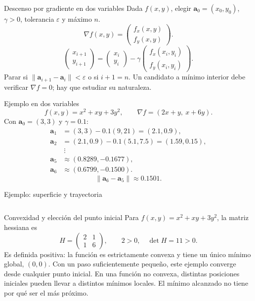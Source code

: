 \documentclass[original_version/main.tex]{subfiles}
\begin{document}
\begin{frame}[t]{Descenso por gradiente en dos variables}
\small Dada $f(x,y)$, elegir $\boldsymbol{a}_0=(x_0,y_0)$, $\gamma>0$, tolerancia $\varepsilon$ y máximo $n$.
\[\nabla f(x,y)=\begin{pmatrix}f_x(x,y)\\f_y(x,y)\end{pmatrix}.\]
\[\begin{pmatrix}x_{i+1}\\y_{i+1}\end{pmatrix}
=\begin{pmatrix}x_i\\y_i\end{pmatrix}
-\gamma\begin{pmatrix}f_x(x_i,y_i)\\f_y(x_i,y_i)\end{pmatrix}.\]
Parar si $\|\boldsymbol{a}_{i+1}-\boldsymbol{a}_i\|<\varepsilon$ o si $i+1=n$.
\medskip Un candidato a mínimo interior debe verificar $\nabla f=0$; hay que estudiar su naturaleza.
\end{frame}
\begin{frame}[t]{Ejemplo en dos variables}
\small
\[f(x,y)=x^2+xy+3y^2,\qquad\nabla f=(2x+y,\ x+6y).\]
Con $\boldsymbol{a}_0=(3,3)$ y $\gamma=0.1$:
\begin{align*}
\boldsymbol{a}_1&=(3,3)-0.1(9,21)=(2.1,0.9),\\
\boldsymbol{a}_2&=(2.1,0.9)-0.1(5.1,7.5)=(1.59,0.15),\\
&\ \vdots\\
\boldsymbol{a}_5&\approx(0.8289,-0.1677),\\
\boldsymbol{a}_6&\approx(0.6799,-0.1500).
\end{align*}
\[\|\boldsymbol{a}_6-\boldsymbol{a}_5\|\approx0.1501.\]
\end{frame}
\begin{frame}[t]{Ejemplo: superficie y trayectoria}
\begin{columns}\end{columns}
\end{frame}
\begin{frame}[t]{Convexidad y elección del punto inicial}
\small
Para $f(x,y)=x^2+xy+3y^2$, la matriz hessiana es
\[H=\begin{pmatrix}2&1\\1&6\end{pmatrix},\qquad 2>0,\quad\det H=11>0.\]
Es definida positiva: la función es estrictamente convexa y tiene un único mínimo global, $(0,0)$.
\medskip
Con un paso suficientemente pequeño, este ejemplo converge desde cualquier punto inicial.
\medskip
En una función no convexa, distintas posiciones iniciales pueden llevar a distintos mínimos locales. El mínimo alcanzado no tiene por qué ser el más próximo.
\end{frame}
\end{document}
